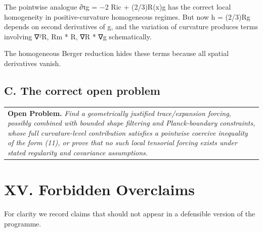 \documentclass[
]{article}
\begin{document}
The pointwise analogue ∂τg = −2 Ric + (2/3)R(x)g has the correct local homogeneity in positive-curvature homogeneous regimes. But now h = (2/3)Rg depends on second derivatives of g, and the variation of curvature produces terms involving ∇²R, Rm * R, ∇R * ∇g schematically.

The homogeneous Berger reduction hides these terms because all spatial derivatives vanish.

\subsection{}\label{section-1}

\subsection{}\label{section-2}

\subsection{C. The correct open problem}\label{c.-the-correct-open-problem}

\begin{longtable}[]{@{}
  >{\raggedright\arraybackslash}p{}@{}}
\toprule\noalign{}
\endhead
\bottomrule\noalign{}
\endlastfoot
\textbf{Open Problem.} \emph{Find a geometrically justified trace/expansion forcing, possibly combined with bounded shape filtering and Planck-boundary constraints, whose full curvature-level contribution satisfies a pointwise coercive inequality of the form (11), or prove that no such local tensorial forcing exists under stated regularity and covariance assumptions.} \\
\end{longtable}

\section{XV. Forbidden Overclaims}\label{xv.-forbidden-overclaims}

For clarity we record claims that should not appear in a defensible version of the programme.
\end{document}
